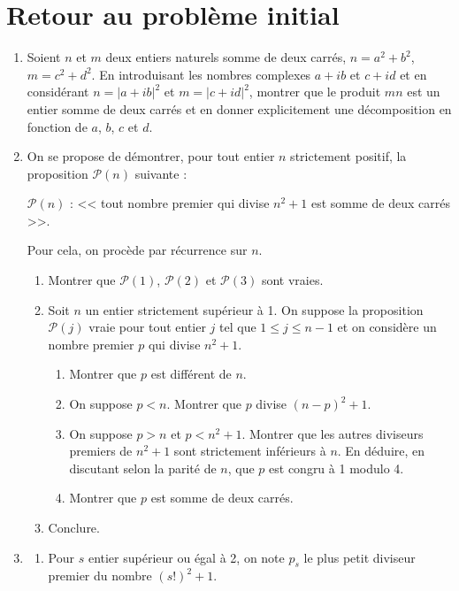 \documentclass[landscape,twocolumn,leqno,a4paper,10pt]{report} %
\renewcommand{\leq}{\leqslant}
\begin{document}
\section{Retour au problème initial}


\begin{enumerate}
	\item Soient $n$ et $m$ deux entiers naturels somme de deux carrés, $n=a^{2}+b^{2}$, $m=c^{2}+d^{2}$. En introduisant les nombres complexes $a+i b$ et $c+i d$ et en considérant $n=|a+i b|^{2}$ et $m=|c+i d|^{2}$, montrer que le produit $m n$ est un entier somme de deux carrés et en donner explicitement une décomposition en fonction de $a$, $b$, $c$ et $d$.
	\item On se propose de démontrer, pour tout entier $n$ strictement positif, la proposition $\mathcal{P}(n)$ suivante : 
	\begin{center}
	$\mathcal{P}(n)$ : << tout nombre premier qui divise $n^{2}+1$ est somme de deux carrés >>.
	\end{center}
	Pour cela, on procède par récurrence sur $n$.
	\begin{enumerate}
		\item Montrer que $\mathcal{P}(1)$, $\mathcal{P}(2)$ et $\mathcal{P}(3)$ sont vraies.
		\item Soit $n$ un entier strictement supérieur à 1. On suppose la proposition $\mathcal{P}(j)$ vraie pour tout entier $j$ tel que $1 \leq j \leq n-1$ et on considère un nombre premier $p$ qui divise $n^{2}+1$.
		\begin{enumerate}
			\item Montrer que $p$ est différent de $n$.
			\item On suppose $p<n$. Montrer que $p$ divise $(n-p)^{2}+1$.
			\item On suppose $p>n$ et $p<n^{2}+1$. Montrer que les autres diviseurs premiers de $n^{2}+1$ sont strictement inférieurs à $n$. En déduire, en discutant selon la parité de $n$, que $p$ est congru à 1 modulo 4.
			\item Montrer que $p$ est somme de deux carrés.
		\end{enumerate}
		\item Conclure.
	\end{enumerate}
	\item \begin{enumerate}
		\item Pour $s$ entier supérieur ou égal à 2, on note $p_{s}$ le plus petit diviseur premier du nombre $(s !)^{2}+1$.\\

\end{enumerate}
\end{enumerate}
\end{document}
